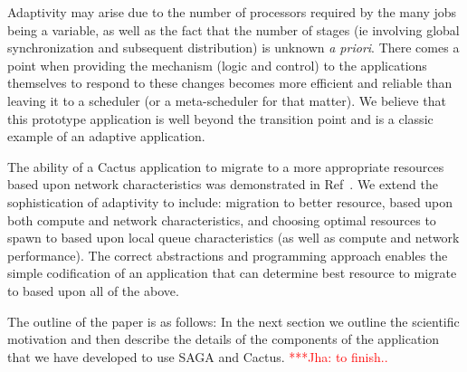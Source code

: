 \documentclass[conference,final]{IEEEtran}
\newcommand{\jhanote}[1]{ {\textcolor{red} { ***Jha: #1 }}}
\begin{document}
Adaptivity may arise due to the number of processors required by the
many jobs being a variable, as well as the fact that the number of
stages (ie involving global synchronization and subsequent
distribution) is unknown {\it a priori}. There comes a point when
providing the mechanism (logic and control) to the applications
themselves to respond to these changes becomes more efficient and
reliable than leaving it to a scheduler (or a meta-scheduler for that
matter). We believe that this prototype application is well beyond the
transition point and is a classic example of an adaptive application.

The ability of a Cactus application to migrate to a more appropriate
resources based upon network characteristics was demonstrated in
Ref~\cite{escience07}.  We extend the sophistication of adaptivity to
include: migration to better resource, based upon both compute and
network characteristics, and choosing optimal resources to spawn to
based upon local queue characteristics (as well as compute and network
performance). The correct abstractions and programming approach
enables the simple codification of an application that can determine
best resource to migrate to based upon all of the above.




The outline of the paper is as follows: In the next section we outline
the scientific motivation and then describe the details of the
components of the application that we have developed to use SAGA and
Cactus.  \jhanote{to finish..}
\end{document}
